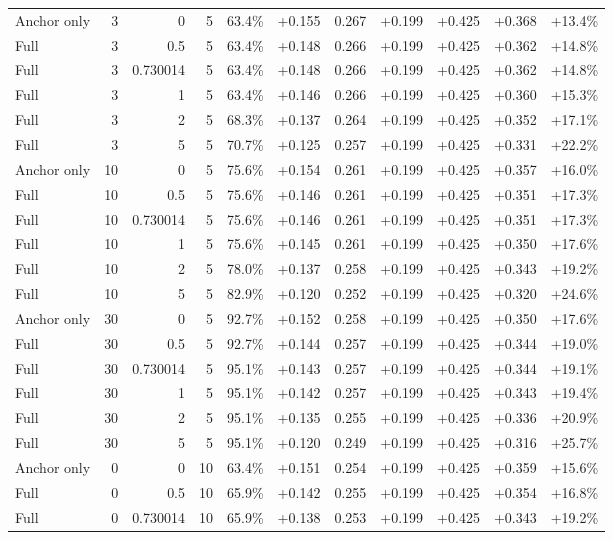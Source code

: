 \begin{table}[htbp]
\begin{tabular}{lrrrccccccc}
Anchor only & 3 & 0 & 5 & 63.4\% & +0.155 & 0.267 & +0.199 & +0.425 & +0.368 & +13.4\% \\
Full & 3 & 0.5 & 5 & 63.4\% & +0.148 & 0.266 & +0.199 & +0.425 & +0.362 & +14.8\% \\
Full & 3 & 0.730014 & 5 & 63.4\% & +0.148 & 0.266 & +0.199 & +0.425 & +0.362 & +14.8\% \\
Full & 3 & 1 & 5 & 63.4\% & +0.146 & 0.266 & +0.199 & +0.425 & +0.360 & +15.3\% \\
Full & 3 & 2 & 5 & 68.3\% & +0.137 & 0.264 & +0.199 & +0.425 & +0.352 & +17.1\% \\
Full & 3 & 5 & 5 & 70.7\% & +0.125 & 0.257 & +0.199 & +0.425 & +0.331 & +22.2\% \\
Anchor only & 10 & 0 & 5 & 75.6\% & +0.154 & 0.261 & +0.199 & +0.425 & +0.357 & +16.0\% \\
Full & 10 & 0.5 & 5 & 75.6\% & +0.146 & 0.261 & +0.199 & +0.425 & +0.351 & +17.3\% \\
Full & 10 & 0.730014 & 5 & 75.6\% & +0.146 & 0.261 & +0.199 & +0.425 & +0.351 & +17.3\% \\
Full & 10 & 1 & 5 & 75.6\% & +0.145 & 0.261 & +0.199 & +0.425 & +0.350 & +17.6\% \\
Full & 10 & 2 & 5 & 78.0\% & +0.137 & 0.258 & +0.199 & +0.425 & +0.343 & +19.2\% \\
Full & 10 & 5 & 5 & 82.9\% & +0.120 & 0.252 & +0.199 & +0.425 & +0.320 & +24.6\% \\
Anchor only & 30 & 0 & 5 & 92.7\% & +0.152 & 0.258 & +0.199 & +0.425 & +0.350 & +17.6\% \\
Full & 30 & 0.5 & 5 & 92.7\% & +0.144 & 0.257 & +0.199 & +0.425 & +0.344 & +19.0\% \\
Full & 30 & 0.730014 & 5 & 95.1\% & +0.143 & 0.257 & +0.199 & +0.425 & +0.344 & +19.1\% \\
Full & 30 & 1 & 5 & 95.1\% & +0.142 & 0.257 & +0.199 & +0.425 & +0.343 & +19.4\% \\
Full & 30 & 2 & 5 & 95.1\% & +0.135 & 0.255 & +0.199 & +0.425 & +0.336 & +20.9\% \\
Full & 30 & 5 & 5 & 95.1\% & +0.120 & 0.249 & +0.199 & +0.425 & +0.316 & +25.7\% \\
Anchor only & 0 & 0 & 10 & 63.4\% & +0.151 & 0.254 & +0.199 & +0.425 & +0.359 & +15.6\% \\
Full & 0 & 0.5 & 10 & 65.9\% & +0.142 & 0.255 & +0.199 & +0.425 & +0.354 & +16.8\% \\
Full & 0 & 0.730014 & 10 & 65.9\% & +0.138 & 0.253 & +0.199 & +0.425 & +0.343 & +19.2\% \\

\end{tabular}
\end{table}
